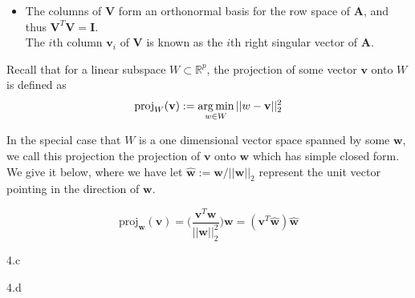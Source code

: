 \begin{answer}
\begin{itemize}
        \item The columns of $\textbf{V}$ form an orthonormal basis for the row space of $\textbf{A}$, and thus $\textbf{V}^{T}\textbf{V} = \textbf{I}$. \\ 
        The $i$th column $\textbf{v}_{i}$ of $\textbf{V}$ is known as the $i$th right singular vector of $\textbf{A}$.  
\end{itemize}

Recall that for a linear subspace $W \subset \mathbb{R}^{p}$, the projection of some vector $\textbf{v}$ onto $W$ is defined as
\begin{equation}
\text{proj}_{W}(\textbf{v}) := \operatorname*{arg\,min}_{w \in W} \vert \vert w - \textbf{v}\vert \vert _{2}^2
\label{proj_def}
\end{equation}

In the special case that $W$ is a one dimensional vector space spanned by some $\textbf{w}$, we call this projection the projection of  $\textbf{v}$ onto $\textbf{w}$ which has simple closed form. We give it below, where we have let $\hat{\textbf{w}} := \textbf{w}/\vert \vert \textbf{w}\vert \vert _2$ represent the unit vector pointing in the direction of $\textbf{w}$.

\begin{equation}
\textrm{proj}_{\textbf{w}}(\textbf{v}) = \bigg(\frac{\textbf{v}^{T}\textbf{w}}{\vert \vert \textbf{w}\vert \vert _2^2}\bigg) \textbf{w} = (\textbf{v}^{T}\hat{\textbf{w}}) \hat{\textbf{w}}
\label{proj_1d}
\end{equation}

\end{answer}
\clearpage

\LARGE
4.c
\normalsize

\begin{answer}
\end{answer}
\clearpage

\LARGE
4.d
\normalsize

\begin{answer}
\end{answer}
\clearpage


